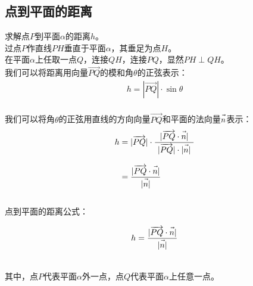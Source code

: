 \documentclass[UTF8]{ctexart}
\let\nvec\vec
\def\vec#1{\nvec{\vphantom b\smash{#1}}}
\begin{document}
\newpage

\subsection{点到平面的距离}
    求解点$P$到平面$\alpha$的距离$h$。\\[5mm]
    过点$P$作直线$PH$垂直于平面$\alpha$，其垂足为点$H$。\\[3mm]
    在平面$\alpha$上任取一点$Q$，连接$QH$，连接$PQ$，显然$PH\perp QH$。\\[6mm]
    我们可以将距离用向量$\overrightarrow{PQ}$的模和角$\theta$的正弦表示：
    \setcounter{equation}{0}
    \begin{align}
        h=|\overrightarrow{PQ}|\cdot\sin{\theta}
    \end{align}\\
    我们可以将角$\theta$的正弦用直线的方向向量$\overrightarrow{PQ}$和平面的法向量$\vec{n}$表示：\vspace{3pt}
    \begin{align}
        h
        &=|\overrightarrow{PQ}|\cdot\frac{|\overrightarrow{PQ}\cdot\vec{n}|}{~|\overrightarrow{PQ}|\cdot|\vec{n}|~}\\[3mm]
        &=\frac{|\overrightarrow{PQ}\cdot\vec{n}|}{|\vec{n}|}
    \end{align}\\
    点到平面的距离公式：
    \begin{large}
        \begin{equation*}
            h=\frac{|\overrightarrow{PQ}\cdot\vec{n}|}{|\vec{n}|}
        \end{equation*}
    \end{large}\\
    其中，点$P$代表平面$\alpha$外一点，点$Q$代表平面$\alpha$上任意一点。\\
\end{document}
